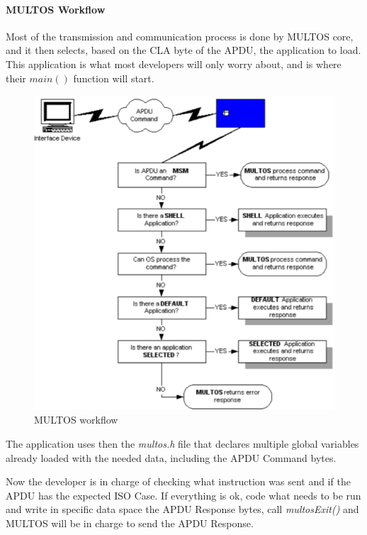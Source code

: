 \paragraph{MULTOS Workflow}

Most of the transmission and communication process is done by MULTOS core, and it then selects, based on the CLA byte of the APDU, the application to load. This application is what most developers will only worry about, and is where their $main()$ function will start.

\begin{figure}[bth]
	\begin{center}
		\includegraphics[width=\linewidth]{gfx/multosWorkflow}
	\end{center}
	\caption{MULTOS workflow}
	\label{fig:multosWorkflow}
\end{figure}

The application uses then the \textit{multos.h} file that declares multiple global variables already loaded with the needed data, including the APDU Command bytes.

Now the developer is in charge of checking what instruction was sent and if the APDU has the expected ISO Case. If everything is ok, code what needs to be run and write in specific data space the APDU Response bytes, call \textit{multosExit()} and MULTOS will be in charge to send the APDU Response.

